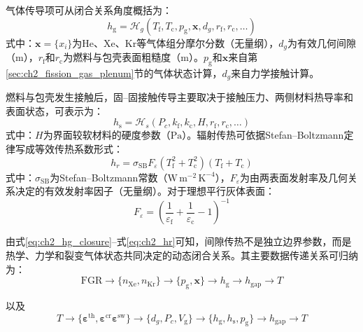 气体传导项可从闭合关系角度概括为：
\begin{equation}
	h_{\mathrm g}
	=\mathcal H_g
	\left(
	T_{\mathrm f},T_{\mathrm c},p_{\mathrm g},\mathbf x,d_g,r_{\mathrm f},r_{\mathrm c},\ldots
	\right)
	\label{eq:ch2_hg_closure}
\end{equation}
\noindent 式中：$\mathbf x=\{x_i\}$为He、Xe、Kr等气体组分摩尔分数（无量纲），$d_g$为有效几何间隙（$\mathrm{m}$），$r_{\mathrm f}$和$r_{\mathrm c}$为燃料与包壳表面粗糙度（$\mathrm{m}$）。$p_{\mathrm g}$和$\mathbf x$来自第\ref{sec:ch2_fission_gas_plenum}节的气体状态计算，$d_g$来自力学接触计算。

燃料与包壳发生接触后，固--固接触传导主要取决于接触压力、两侧材料热导率和表面状态，可表示为：
\begin{equation}
	h_{\mathrm s}
	=\mathcal H_s
	\left(
	P_c,k_{\mathrm f},k_{\mathrm c},H,r_{\mathrm f},r_{\mathrm c},\ldots
	\right)
	\label{eq:ch2_hs_closure}
\end{equation}
\noindent 式中：$H$为界面较软材料的硬度参数（$\mathrm{Pa}$）。辐射传热可依据Stefan--Boltzmann定律写成等效传热系数形式：
\begin{equation}
	h_r
	=\sigma_{\mathrm{SB}}F_{\varepsilon}
	\left(T_{\mathrm f}^2+T_{\mathrm c}^2\right)
	\left(T_{\mathrm f}+T_{\mathrm c}\right)
	\label{eq:ch2_hr}
\end{equation}
\noindent 式中：$\sigma_{\mathrm{SB}}$为Stefan--Boltzmann常数（$\mathrm{W\,m^{-2}\,K^{-4}}$），$F_{\varepsilon}$为由两表面发射率及几何关系决定的有效发射率因子（无量纲）。对于理想平行灰体表面：
\begin{equation}
	F_{\varepsilon}
	=\left(
	\frac{1}{\varepsilon_{\mathrm f}}
	+\frac{1}{\varepsilon_{\mathrm c}}
	-1
	\right)^{-1}
	\label{eq:ch2_effective_emissivity}
\end{equation}


由式\eqref{eq:ch2_hg_closure}--式\eqref{eq:ch2_hr}可知，间隙传热不是独立边界参数，而是热学、力学和裂变气体状态共同决定的动态闭合关系。其主要数据传递关系可归纳为：
\begin{equation}
	\mathrm{FGR}
	\rightarrow
	\{n_{\mathrm{Xe}},n_{\mathrm{Kr}}\}
	\rightarrow
	\{p_{\mathrm g},\mathbf x\}
	\rightarrow
	h_{\mathrm g}
	\rightarrow
	h_{\mathrm{gap}}
	\rightarrow
	T
	\label{eq:ch2_fgr_gap_temperature_chain}
\end{equation}

以及
\begin{equation}
	T
	\rightarrow
	\{\boldsymbol{\varepsilon}^{\mathrm{th}},\boldsymbol{\varepsilon}^{\mathrm{cr}}
	\boldsymbol{\varepsilon}^{\mathrm{sw}}\}
	\rightarrow
	\{d_g,P_c,V_{\mathrm g}\}
	\rightarrow
	\{h_{\mathrm g},h_{\mathrm s},p_{\mathrm g}\}
	\rightarrow
	h_{\mathrm{gap}}
	\rightarrow
	T
	\label{eq:ch2_mech_gap_temperature_chain}
\end{equation}

